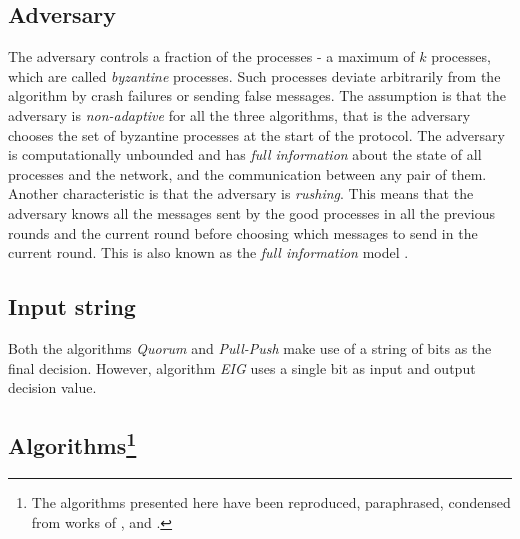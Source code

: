 \subsection{Adversary}
The adversary controls a fraction of the processes - a maximum of $k$ processes, which are called \textit{byzantine} processes. Such processes deviate arbitrarily from the algorithm by crash failures or sending false messages. The assumption is that the adversary is \textit{non-adaptive} for all the three algorithms, that is the adversary chooses the set of byzantine processes at the start of the protocol. The adversary is computationally unbounded and has \textit{full information} about the state of all processes and the network, and the communication between any pair of them. Another characteristic is that the adversary is \textit{rushing}. This means that the adversary knows all the messages sent by the good processes in all the previous rounds and the current round before choosing which messages to send in the current round. This is also known as the \textit{full information} model \cite{GGL98}.

\subsection{Input string}
Both the algorithms \textit{Quorum} and \textit{Pull-Push}  make use of a string of bits as the final decision. However, algorithm \textit{EIG} uses a single bit as input and output decision value.


\subsection{Algorithms\protect\footnote{The algorithms presented here have been reproduced, paraphrased, condensed from works of \cite{BPV06}, \cite{KM13} and \cite{BGH13}.}}

